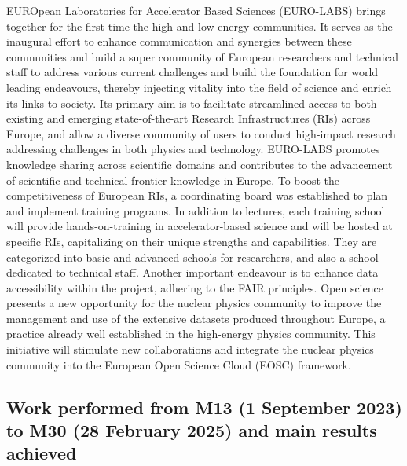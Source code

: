 EUROpean Laboratories for Accelerator Based Sciences (EURO-LABS) brings together for the first time the high and low-energy communities. It serves as the inaugural effort to enhance communication and synergies between these communities and build a super community of European researchers and technical staff to address various current challenges and build the foundation for world leading endeavours, thereby injecting vitality into the field of science and enrich its links to society. Its primary aim is to facilitate streamlined access to both existing and emerging state-of-the-art Research Infrastructures (RIs) across Europe, and allow a diverse community of users to conduct high-impact research addressing challenges in both physics and technology. EURO-LABS promotes knowledge sharing across scientific domains and contributes to the advancement of scientific and technical frontier knowledge in Europe. To boost the competitiveness of European RIs, a coordinating board was established to plan and implement training programs. In addition to lectures, each training school will provide hands-on-training in accelerator-based science and will be hosted at specific RIs, capitalizing on their unique strengths and capabilities. They are categorized into basic and advanced schools for researchers, and also a school dedicated to technical staff.  Another important endeavour is to enhance data accessibility within the project, adhering to the FAIR principles. Open science presents a new opportunity for the nuclear physics community to improve the management and use of the extensive datasets produced throughout Europe, a practice already well established in the high-energy physics community.  This initiative will stimulate new collaborations and integrate the nuclear physics community into the European Open Science Cloud (EOSC) framework.


\subsection*{Work performed from M13 (1 September 2023) to M30 (28 February 2025) and main results achieved}

